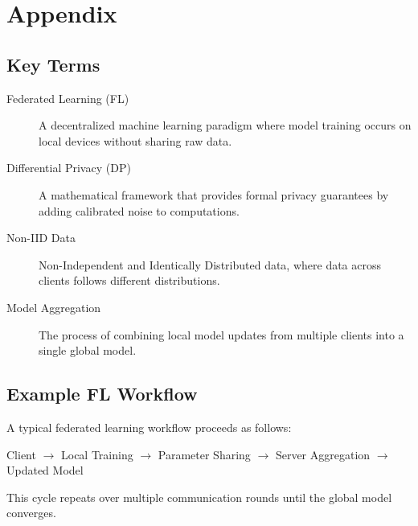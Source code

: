 
\chapter{Appendix} %
\label{app:appendixA}

\section{Key Terms}

\begin{description}
    \item[Federated Learning (FL)] A decentralized machine learning paradigm where model training occurs on local devices without sharing raw data.
    \item[Differential Privacy (DP)] A mathematical framework that provides formal privacy guarantees by adding calibrated noise to computations.
    \item[Non-IID Data] Non-Independent and Identically Distributed data, where data across clients follows different distributions.
    \item[Model Aggregation] The process of combining local model updates from multiple clients into a single global model.
\end{description}

\section{Example FL Workflow}

A typical federated learning workflow proceeds as follows:

\begin{center}
Client $\rightarrow$ Local Training $\rightarrow$ Parameter Sharing $\rightarrow$ Server Aggregation $\rightarrow$ Updated Model
\end{center}

This cycle repeats over multiple communication rounds until the global model converges.
